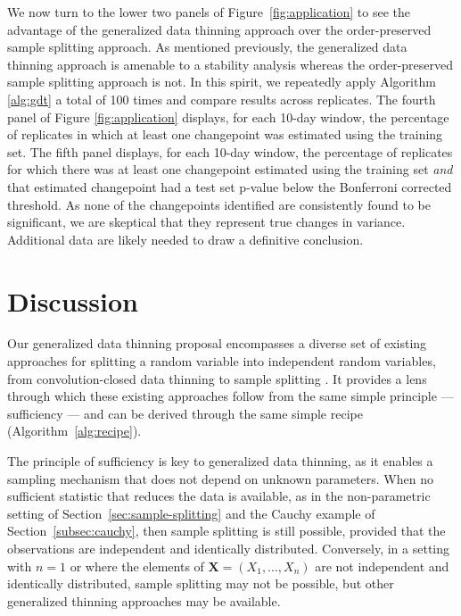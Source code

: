 \documentclass[12pt]{article}
\begin{document}
We now turn to the lower two panels of Figure~\ref{fig:application} to see the advantage of the generalized data thinning approach over the order-preserved sample splitting approach. As mentioned previously, the generalized data thinning approach is amenable to a stability analysis whereas the order-preserved sample splitting approach is not.  
In this spirit,  
we repeatedly apply Algorithm \ref{alg:gdt} a total of 100 times and compare results across replicates.
The fourth panel of  Figure \ref{fig:application} displays, for each 10-day window, the percentage of replicates in which at least one changepoint was estimated  using the training set. The fifth panel displays, for each 10-day window, the percentage of replicates for  which there was at least one changepoint estimated using the training set \emph{and} that estimated changepoint had a test set p-value below the Bonferroni corrected threshold. As none of the changepoints identified are consistently found to be significant, we are skeptical that they represent true changes in variance. Additional data are likely needed to draw a definitive conclusion.






\section{Discussion}
\label{sec:discussion}

Our generalized data thinning proposal encompasses a diverse set of existing approaches for splitting a random variable into  independent random variables, from convolution-closed data thinning \citep{neufeld2023data} to sample splitting \citep{cox1975note}. It provides a lens through which these existing approaches follow from the same simple principle --- sufficiency ---  and can be derived through the same simple recipe (Algorithm~\ref{alg:recipe}).  


The principle of sufficiency is key to generalized data thinning, as it enables a sampling mechanism that does not depend on unknown parameters.  When no sufficient statistic that reduces the data is available, as in the non-parametric setting of Section~\ref{sec:sample-splitting} and the Cauchy example of Section~\ref{subsec:cauchy}, then sample splitting is still possible, provided that the observations are independent and identically distributed. Conversely, in a setting with $n=1$ or where the elements of $\mathbf{X}=(X_1,\ldots,X_n)$ are not independent and identically distributed, sample splitting may not be possible, but other  generalized thinning approaches may be available. 
\end{document}

